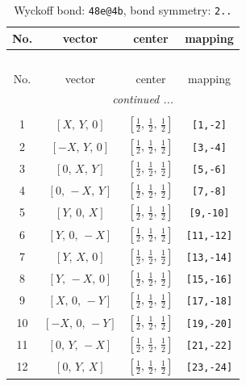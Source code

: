 \documentclass[fleqn,8pt]{jsarticle}
\begin{document}
\renewcommand{\arraystretch}{1.2}
\begin{longtable}{cccc}
\caption{Wyckoff bond: {\tt 48e@4b}, bond symmetry: {\tt 2..}}
 \\
 \hline \hline
No. & vector & center & mapping \\ \hline \endfirsthead

\multicolumn{3}{l}{\tablename\ \thetable{}} \\
 \hline \hline
No. & vector & center & mapping \\ \hline \endhead

 \hline \hline
\multicolumn{3}{r}{\footnotesize\it continued ...} \\ \endfoot

 \hline \hline
\multicolumn{3}{r}{} \\ \endlastfoot

1 & $\left[ X,\, Y,\, 0 \right]$ & $\left[ \frac{1}{2},\, \frac{1}{2},\, \frac{1}{2} \right]$ & {\tt [1,-2]} \\ \hline
2 & $\left[ - X,\, Y,\, 0 \right]$ & $\left[ \frac{1}{2},\, \frac{1}{2},\, \frac{1}{2} \right]$ & {\tt [3,-4]} \\ \hline
3 & $\left[ 0,\, X,\, Y \right]$ & $\left[ \frac{1}{2},\, \frac{1}{2},\, \frac{1}{2} \right]$ & {\tt [5,-6]} \\ \hline
4 & $\left[ 0,\, - X,\, Y \right]$ & $\left[ \frac{1}{2},\, \frac{1}{2},\, \frac{1}{2} \right]$ & {\tt [7,-8]} \\ \hline
5 & $\left[ Y,\, 0,\, X \right]$ & $\left[ \frac{1}{2},\, \frac{1}{2},\, \frac{1}{2} \right]$ & {\tt [9,-10]} \\ \hline
6 & $\left[ Y,\, 0,\, - X \right]$ & $\left[ \frac{1}{2},\, \frac{1}{2},\, \frac{1}{2} \right]$ & {\tt [11,-12]} \\ \hline
7 & $\left[ Y,\, X,\, 0 \right]$ & $\left[ \frac{1}{2},\, \frac{1}{2},\, \frac{1}{2} \right]$ & {\tt [13,-14]} \\ \hline
8 & $\left[ Y,\, - X,\, 0 \right]$ & $\left[ \frac{1}{2},\, \frac{1}{2},\, \frac{1}{2} \right]$ & {\tt [15,-16]} \\ \hline
9 & $\left[ X,\, 0,\, - Y \right]$ & $\left[ \frac{1}{2},\, \frac{1}{2},\, \frac{1}{2} \right]$ & {\tt [17,-18]} \\ \hline
10 & $\left[ - X,\, 0,\, - Y \right]$ & $\left[ \frac{1}{2},\, \frac{1}{2},\, \frac{1}{2} \right]$ & {\tt [19,-20]} \\ \hline
11 & $\left[ 0,\, Y,\, - X \right]$ & $\left[ \frac{1}{2},\, \frac{1}{2},\, \frac{1}{2} \right]$ & {\tt [21,-22]} \\ \hline
12 & $\left[ 0,\, Y,\, X \right]$ & $\left[ \frac{1}{2},\, \frac{1}{2},\, \frac{1}{2} \right]$ & {\tt [23,-24]} \\
\end{longtable}
\end{document}
